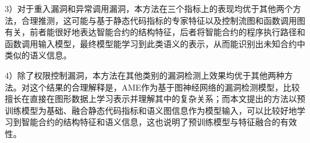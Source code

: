 3）对于重入漏洞和异常调用漏洞，本方法在三个指标上的表现均优于其他两个方法，合理推测，这可能与基于静态代码指标的专家特征以及控制流图和函数调用图有关，前者能很好地表达智能合约的结构特征，后者将智能合约的程序执行路径和函数调用输入模型，最终模型能学习到此类语义的表示，从而能识别出未知合约中类似的语义信息。

4）除了权限控制漏洞，本方法在其他类别的漏洞检测上效果均优于其他两种方法。对这个结果的合理解释是，AME作为基于图神经网络的漏洞检测模型，比较擅长在直接在图形数据上学习表示并理解其中的复杂关系；而本文提出的方法以预训练模型为基础、融合静态代码指标和语义图信息作为模型输入，可以比较好地学习到智能合约的结构特征和语义信息，这也说明了预训练模型与特征融合的有效性。




